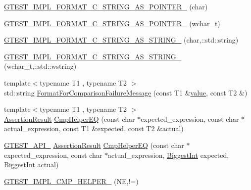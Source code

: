 \begin{DoxyCompactItemize}
\item 
\hyperlink{namespacetesting_1_1internal_a3682f962ae0ec1c0eca6444ca0a09e91}{G\-T\-E\-S\-T\-\_\-\-I\-M\-P\-L\-\_\-\-F\-O\-R\-M\-A\-T\-\_\-\-C\-\_\-\-S\-T\-R\-I\-N\-G\-\_\-\-A\-S\-\_\-\-P\-O\-I\-N\-T\-E\-R\-\_\-} (char)
\item 
\hyperlink{namespacetesting_1_1internal_a85e08f00d443221e529a0a85a90fbaeb}{G\-T\-E\-S\-T\-\_\-\-I\-M\-P\-L\-\_\-\-F\-O\-R\-M\-A\-T\-\_\-\-C\-\_\-\-S\-T\-R\-I\-N\-G\-\_\-\-A\-S\-\_\-\-P\-O\-I\-N\-T\-E\-R\-\_\-} (wchar\-\_\-t)
\item 
\hyperlink{namespacetesting_1_1internal_a9dceb71a64d780beb2db1ed5bf24ad3f}{G\-T\-E\-S\-T\-\_\-\-I\-M\-P\-L\-\_\-\-F\-O\-R\-M\-A\-T\-\_\-\-C\-\_\-\-S\-T\-R\-I\-N\-G\-\_\-\-A\-S\-\_\-\-S\-T\-R\-I\-N\-G\-\_\-} (char,\-::std\-::string)
\item 
\hyperlink{namespacetesting_1_1internal_afaec8a5f66e926e86cd5abed5254ff36}{G\-T\-E\-S\-T\-\_\-\-I\-M\-P\-L\-\_\-\-F\-O\-R\-M\-A\-T\-\_\-\-C\-\_\-\-S\-T\-R\-I\-N\-G\-\_\-\-A\-S\-\_\-\-S\-T\-R\-I\-N\-G\-\_\-} (wchar\-\_\-t,\-::std\-::wstring)
\item 
{\footnotesize template$<$typename T1 , typename T2 $>$ }\\std\-::string \hyperlink{namespacetesting_1_1internal_a91ab078f10adc669f09b7f604975c518}{Format\-For\-Comparison\-Failure\-Message} (const T1 \&\hyperlink{highgui__c_8h_ad4670c92695d4327c21292905a803901}{value}, const T2 \&)
\item 
{\footnotesize template$<$typename T1 , typename T2 $>$ }\\\hyperlink{classtesting_1_1AssertionResult}{Assertion\-Result} \hyperlink{namespacetesting_1_1internal_a36f7c44fad92225cbb45fde1642cf30e}{Cmp\-Helper\-E\-Q} (const char $\ast$expected\-\_\-expression, const char $\ast$actual\-\_\-expression, const T1 \&expected, const T2 \&actual)
\item 
\hyperlink{ts__gtest_8h_aa73be6f0ba4a7456180a94904ce17790}{G\-T\-E\-S\-T\-\_\-\-A\-P\-I\-\_\-} \hyperlink{classtesting_1_1AssertionResult}{Assertion\-Result} \hyperlink{namespacetesting_1_1internal_a697feef6eee5aa00dd9cfe0708430572}{Cmp\-Helper\-E\-Q} (const char $\ast$expected\-\_\-expression, const char $\ast$actual\-\_\-expression, \hyperlink{namespacetesting_1_1internal_a05c6bd9ede5ccdf25191a590d610dcc6}{Biggest\-Int} expected, \hyperlink{namespacetesting_1_1internal_a05c6bd9ede5ccdf25191a590d610dcc6}{Biggest\-Int} actual)
\item 
\hyperlink{namespacetesting_1_1internal_aa3a0659f0e495c276d69bc9beddb268a}{G\-T\-E\-S\-T\-\_\-\-I\-M\-P\-L\-\_\-\-C\-M\-P\-\_\-\-H\-E\-L\-P\-E\-R\-\_\-} (N\-E,!=)

\end{DoxyCompactItemize}
